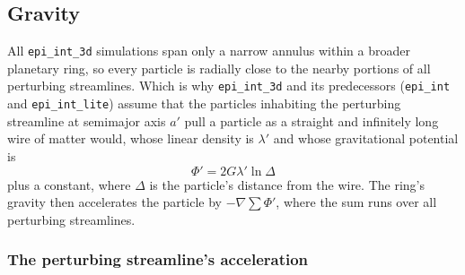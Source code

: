 \documentclass[twocolumn]{aastex702}
\newcommand{\code}[1]{\texttt{#1}}   %
\begin{document}
\subsection{Gravity}
\label{sec:ring_gravity}

All \code{epi\_int\_3d} simulations span only a narrow annulus within a broader planetary ring, so every particle is
radially close to the nearby portions of all perturbing streamlines. Which is why \code{epi\_int\_3d} and its
predecessors (\code{epi\_int} and \code{epi\_int\_lite}) assume that the particles inhabiting the perturbing
streamline at semimajor axis $a'$ pull a particle as a straight and infinitely long wire of matter would, whose linear
density is $\lambda'$ and whose gravitational potential is
\begin{equation}
    \label{eqn:wire_phi}
    \Phi' = 2G\lambda'\ln\Delta
\end{equation}
plus a constant, where $\Delta$ is the particle's distance from the wire. The ring's gravity then accelerates the
particle by $-\nabla\sum\Phi'$, where the sum runs over all perturbing streamlines.

\subsubsection{The perturbing streamline's acceleration}
\label{sec:wire}
\end{document}
